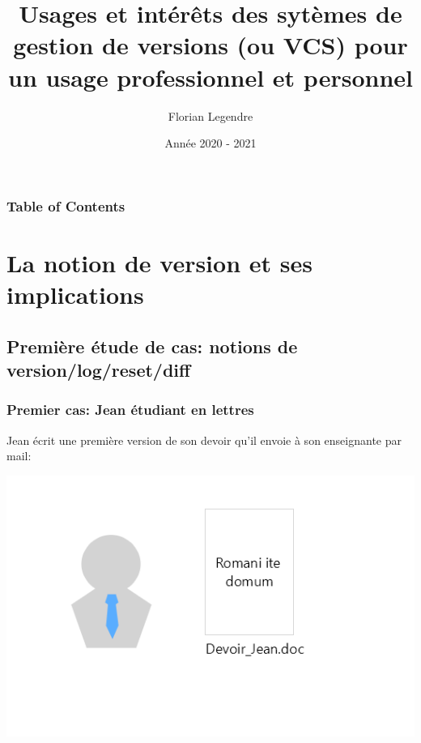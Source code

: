 \documentclass{beamer}
\title[VCS]{Usages et intérêts des sytèmes de gestion de versions (ou VCS) pour un usage professionnel et personnel}
\author{Florian Legendre}
\institute{Université de Poitiers}
\date{Année 2020 - 2021}
\begin{document}
\frame{\titlepage}

\begin{frame}
\frametitle{Table of Contents}
\tableofcontents
\end{frame}

\section{La notion de version et ses implications}

\subsection{Première étude de cas: notions de version/log/reset/diff}
\begin{frame}
\frametitle{Premier cas: Jean étudiant en lettres}
Jean écrit une première version de son devoir qu'il envoie à son enseignante par mail:
\begin{center}
    \includegraphics[scale=0.3]{images/firstScenario/firstScenario_diapo1.png}
\end{center}
\end{frame}
\end{document}
